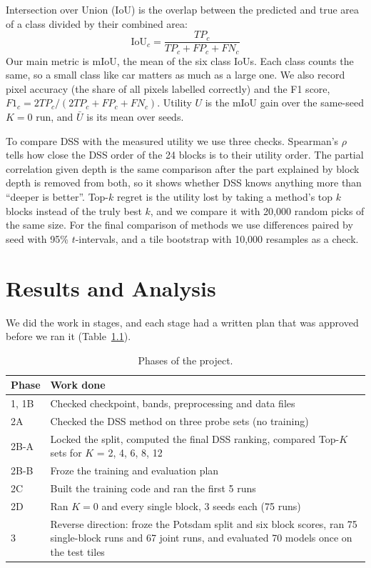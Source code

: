 \documentclass[11pt,a4paper]{report}
\begin{document}
Intersection over Union (IoU) is the overlap between the predicted and true area of a class divided by their combined area:
\begin{equation}
    \text{IoU}_c = \frac{TP_c}{TP_c + FP_c + FN_c}
\end{equation}
Our main metric is mIoU, the mean of the six class IoUs. Each class counts the same, so a small class like car matters as much as a large one. We also record pixel accuracy (the share of all pixels labelled correctly) and the F1 score, $F1_c = 2TP_c / (2TP_c + FP_c + FN_c)$. Utility $U$ is the mIoU gain over the same-seed $K = 0$ run, and $\bar U$ is its mean over seeds.

To compare DSS with the measured utility we use three checks. Spearman's $\rho$ tells how close the DSS order of the 24 blocks is to their utility order. The partial correlation given depth is the same comparison after the part explained by block depth is removed from both, so it shows whether DSS knows anything more than ``deeper is better''. Top-$k$ regret is the utility lost by taking a method's top $k$ blocks instead of the truly best $k$, and we compare it with 20,000 random picks of the same size. For the final comparison of methods we use differences paired by seed with 95\% $t$-intervals, and a tile bootstrap with 10,000 resamples as a check.

\chapter{Results and Analysis}
\label{ch:results}

We did the work in stages, and each stage had a written plan that was approved before we ran it (Table~\ref{tab:phases}).

\begin{table}[t]
\centering
\caption{Phases of the project.}
\label{tab:phases}
\small
\begin{tabular}{@{}lp{6.1cm}@{}}
\toprule
\textbf{Phase} & \textbf{Work done} \\
\midrule
1, 1B & Checked checkpoint, bands, preprocessing and data files \\
2A & Checked the DSS method on three probe sets (no training) \\
2B-A & Locked the split, computed the final DSS ranking, compared Top-$K$ sets for $K$ = 2, 4, 6, 8, 12 \\
2B-B & Froze the training and evaluation plan \\
2C & Built the training code and ran the first 5 runs \\
2D & Ran $K = 0$ and every single block, 3 seeds each (75 runs) \\
3 & Reverse direction: froze the Potsdam split and six block scores, ran 75 single-block runs and 67 joint runs, and evaluated 70 models once on the test tiles \\
\bottomrule
\end{tabular}
\end{table}
\end{document}
